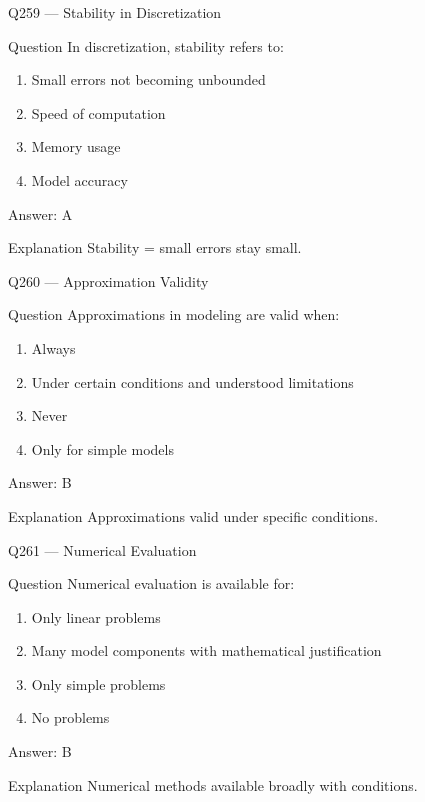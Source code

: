 \documentclass[aspectratio=169,8pt]{beamer}
\begin{document}
\begin{frame}{Q259 --- Stability in Discretization}
\begin{block}{Question}
In discretization, stability refers to:
\begin{enumerate}
\item Small errors not becoming unbounded
\item Speed of computation
\item Memory usage
\item Model accuracy
\end{enumerate}
\end{block}
\begin{exampleblock}{Answer: A}\end{exampleblock}
\begin{block}{Explanation}
Stability = small errors stay small.
\end{block}
\end{frame}

\begin{frame}{Q260 --- Approximation Validity}
\begin{block}{Question}
Approximations in modeling are valid when:
\begin{enumerate}
\item Always
\item Under certain conditions and understood limitations
\item Never
\item Only for simple models
\end{enumerate}
\end{block}
\begin{exampleblock}{Answer: B}\end{exampleblock}
\begin{block}{Explanation}
Approximations valid under specific conditions.
\end{block}
\end{frame}

\begin{frame}{Q261 --- Numerical Evaluation}
\begin{block}{Question}
Numerical evaluation is available for:
\begin{enumerate}
\item Only linear problems
\item Many model components with mathematical justification
\item Only simple problems
\item No problems
\end{enumerate}
\end{block}
\begin{exampleblock}{Answer: B}\end{exampleblock}
\begin{block}{Explanation}
Numerical methods available broadly with conditions.
\end{block}
\end{frame}
\end{document}
